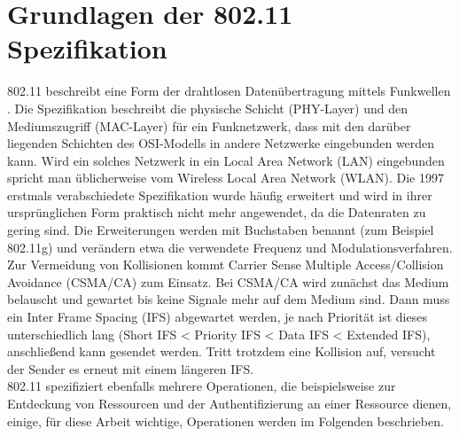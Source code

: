 \section{Grundlagen der 802.11 Spezifikation}
\label{ch:phase1:sec:grundlagen}
802.11 beschreibt eine Form der drahtlosen Datenübertragung mittels Funkwellen \cite{ieee2012macphy}.
Die Spezifikation beschreibt die physische Schicht (PHY-Layer) und den Mediumszugriff (MAC-Layer) für ein Funknetzwerk, dass mit den darüber liegenden Schichten des OSI-Modells in andere Netzwerke eingebunden werden kann.
Wird ein solches Netzwerk in ein Local Area Network (LAN) eingebunden spricht man üblicherweise vom Wireless Local Area Network (WLAN).
Die 1997 erstmals verabschiedete Spezifikation wurde häufig erweitert und wird in ihrer ursprünglichen Form praktisch nicht mehr angewendet, da die Datenraten zu gering sind.
Die Erweiterungen werden mit Buchstaben benannt (zum Beispiel 802.11g) und verändern etwa die verwendete Frequenz und Modulationsverfahren.\\
Zur Vermeidung von Kollisionen kommt Carrier Sense Multiple Access/Collision Avoidance (CSMA/CA) zum Einsatz.
Bei CSMA/CA wird zunächst das Medium belauscht und gewartet bis keine Signale mehr auf dem Medium sind. 
Dann muss ein Inter Frame Spacing (IFS) abgewartet werden, je nach Priorität ist dieses unterschiedlich lang (Short IFS < Priority IFS < Data IFS < Extended IFS), anschließend kann gesendet werden.
Tritt trotzdem eine Kollision auf, versucht der Sender es erneut mit einem längeren IFS.\\
802.11 spezifiziert ebenfalls mehrere Operationen, die beispielsweise zur Entdeckung von Ressourcen und der Authentifizierung an einer Ressource dienen, einige, für diese Arbeit wichtige, Operationen werden im Folgenden beschrieben.

